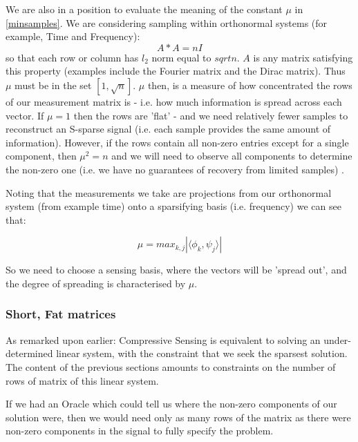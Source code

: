 We are also in a position to evaluate the meaning of the constant \(\mu\) in \ref{minsamples}. We are considering sampling within orthonormal systems (for example, Time and Frequency):
%
\begin{equation}
A*A = nI
\end{equation}
\label{orthonormal}
%
so that each row or column has \(l_2\) norm equal to \(sqrt{n}\). \(A\) is any matrix satisfying this property (examples include the Fourier matrix and the Dirac matrix). Thus \(\mu\) must be in the set \(\left[1, \sqrt{n}\right]\). \(\mu\) then, is a measure of how concentrated the rows of our measurement matrix is - i.e. how much information is spread across each vector. If \(\mu = 1\) then the rows are 'flat' -  and we need relatively fewer samples to reconstruct an S-sparse signal (i.e. each sample provides the same amount of information). However, if the rows contain all non-zero entries except for a single component, then \(\mu^2 = n\) and we will need to observe all components to determine the non-zero one (i.e. we have no guarantees of recovery from limited samples) \cite{Candes2007}. 

Noting that the measurements we take are projections from our orthonormal system (from example time) onto a sparsifying basis (i.e. frequency) we can see that:

\begin{equation}
\mu = max_{k,j} |\langle \phi_k, \psi_j \rangle |
\end{equation}
\label {mudef}
 
So we need to choose a sensing basis, where the vectors will be 'spread out', and the degree of spreading is characterised by \(\mu\).

\subsubsection{Short, Fat matrices}
As remarked upon earlier: Compressive Sensing is equivalent to solving an under-determined linear system, with the constraint that we seek the sparsest solution. The content of the previous sections amounts to constraints on the number of rows of matrix of this linear system. 

If we had an Oracle which could tell us where the non-zero components of our solution were, then we would need only as many rows of the matrix as there were non-zero components in the signal to fully specify the problem. 


